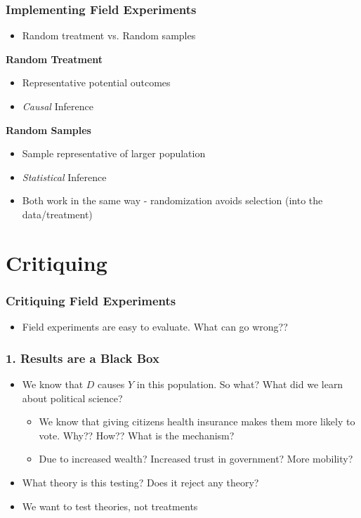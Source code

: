 \documentclass[xcolor=x11names,compress]{beamer}\usepackage[]{graphicx}\usepackage[]{color}
\renewcommand{\(}{\begin{columns}}
\renewcommand{\)}{\end{columns}}
\newcommand{\<}[1]{\begin{column}{#1}}
\renewcommand{\>}{\end{column}}
\begin{document}
\begin{frame}
\frametitle{Implementing Field Experiments}
\begin{itemize}
\item Random treatment vs. Random samples
\end{itemize}
\begin{multicols}{2}
\textbf{Random Treatment}
\begin{itemize}
\pause
\item Representative potential outcomes
\pause
\item \textit{Causal} Inference
\end{itemize}
\columnbreak
\textbf{Random Samples}
\begin{itemize}
\pause
\item Sample representative of larger population
\pause
\item \textit{Statistical} Inference
\end{itemize}
\end{multicols} 
\pause
\begin{itemize}
\item Both work in the same way - randomization avoids selection (into the data/treatment)
\end{itemize}
\end{frame}

\section{Critiquing}

\begin{frame}
\frametitle{Critiquing Field Experiments}
\begin{itemize}
\item Field experiments are easy to evaluate. What can go wrong??
\end{itemize}
\end{frame}

\begin{frame}
\frametitle{1. Results are a Black Box}
\begin{itemize}
\item We know that $D$ causes $Y$ in this population. \pause So what? What did we learn about political science?
\pause
\begin{itemize}
\item We know that giving citizens health insurance makes them more likely to vote. \pause Why?? How?? What is the mechanism?
\pause
\item Due to increased wealth? Increased trust in government? More mobility?
\end{itemize}
\pause
\item What theory is this testing? \pause Does it reject any theory?
\pause
\item We want to test theories, not treatments
\end{itemize}
\end{frame}
\end{document}
